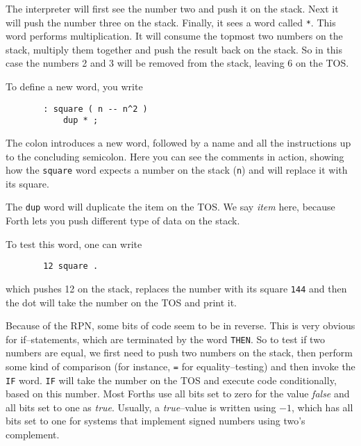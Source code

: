 The interpreter will first see the number two and push it on the stack. Next
it will push the number three on the stack. Finally, it sees a word called
\texttt{*}.  This word performs multiplication. It will consume the topmost
two numbers on the stack, multiply them together and push the result back on
the stack. So in this case the numbers 2 and 3 will be removed from the
stack, leaving 6 on the \ac{TOS}.

To define a new word, you write

\begin{figure}[H]
  \centering
  \begin{Verbatim}
  : square ( n -- n^2 )
      dup * ;
  \end{Verbatim}
\end{figure}

The colon introduces a new word, followed by a name and all the instructions
up to the concluding semicolon.  Here you can see the comments in action,
showing how the \texttt{square} word expects a number on the stack
(\texttt{n}) and will replace it with its square.

The \texttt{dup} word will duplicate the item on the \ac{TOS}.  We
say \textit{item} here, because Forth lets you push different type of data
on the stack.

To test this word, one can write 

\begin{figure}[H]
  \centering
  \begin{Verbatim}
  12 square .
  \end{Verbatim}
\end{figure}

which pushes 12 on the stack, replaces the number with its square
\texttt{144} and then the dot will take the number on the \ac{TOS}
and print it.

Because of the \ac{RPN}, some bits of code seem to be in reverse.  This is
very obvious for if--statements, which are terminated by the word
\texttt{THEN}.  So to test if two numbers are equal, we first need to push
two numbers on the stack, then perform some kind of comparison (for
instance, \texttt{=} for equality--testing) and then invoke the
\texttt{IF} word.  \texttt{IF} will take the number on the \ac{TOS}
and execute code conditionally, based on this number.  Most Forths use all
bits set to zero for the value \textit{false} and all bits set to one as
\textit{true}.  Usually, a \textit{true}--value is written using $-1$,
which has all bits set to one for systems that implement signed numbers
using two's complement.

